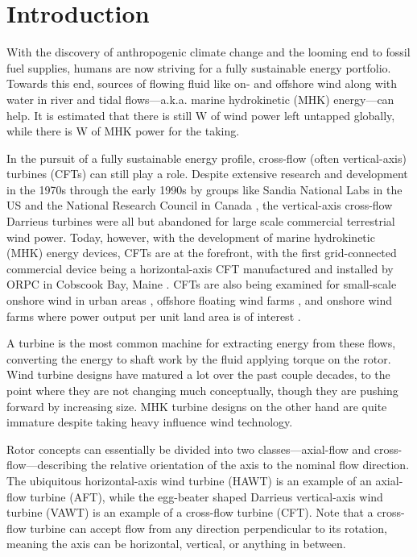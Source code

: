 \chapter{Introduction}

With the discovery of anthropogenic climate change and the looming end to fossil
fuel supplies, humans are now striving for a fully sustainable energy portfolio.
Towards this end, sources of flowing fluid like on- and offshore wind along with
water in river and tidal flows---a.k.a. marine hydrokinetic (MHK) energy---can
help. It is estimated that there is still  W of wind power left untapped globally, while there is
 W of MHK power for the
taking. 



In the pursuit of a fully sustainable energy profile, cross-flow (often
vertical-axis) turbines (CFTs) can still play a role. Despite extensive research
and development in the 1970s through the early 1990s by groups like Sandia
National Labs in the US \cite{Sutherland2012} and the National Research Council
in Canada \cite{Para2002}, the vertical-axis cross-flow Darrieus turbines were
all but abandoned for large scale commercial terrestrial wind power. Today,
however, with the development of marine hydrokinetic (MHK) energy devices, CFTs
are at the forefront, with the first grid-connected commercial device being a
horizontal-axis CFT manufactured and installed by ORPC in Cobscook Bay, Maine
\cite{ORPC2012}. CFTs are also being examined for small-scale onshore wind in
urban areas \cite{Lott2015}, offshore floating wind farms \cite{Paulsen2011,
    Sandia2012}, and onshore wind farms where power output per unit land area is of
interest \cite{Dabiri2011}.



A turbine is the most common machine for extracting energy from these flows,
converting the energy to shaft work by the fluid applying torque on the rotor.
Wind turbine designs have matured a lot over the past couple decades, to the
point where they are not changing much conceptually, though they are pushing
forward by increasing size. MHK turbine designs on the other hand are quite
immature despite taking heavy influence wind technology.

Rotor concepts can essentially be divided into two classes---axial-flow and
cross-flow---describing the relative orientation of the axis to the nominal flow
direction. The ubiquitous horizontal-axis wind turbine (HAWT) is an example of
an axial-flow turbine (AFT), while the egg-beater shaped Darrieus vertical-axis
wind turbine (VAWT) is an example of a cross-flow turbine (CFT). Note that a
cross-flow turbine can accept flow from any direction perpendicular to its
rotation, meaning the axis can be horizontal, vertical, or anything in between.

